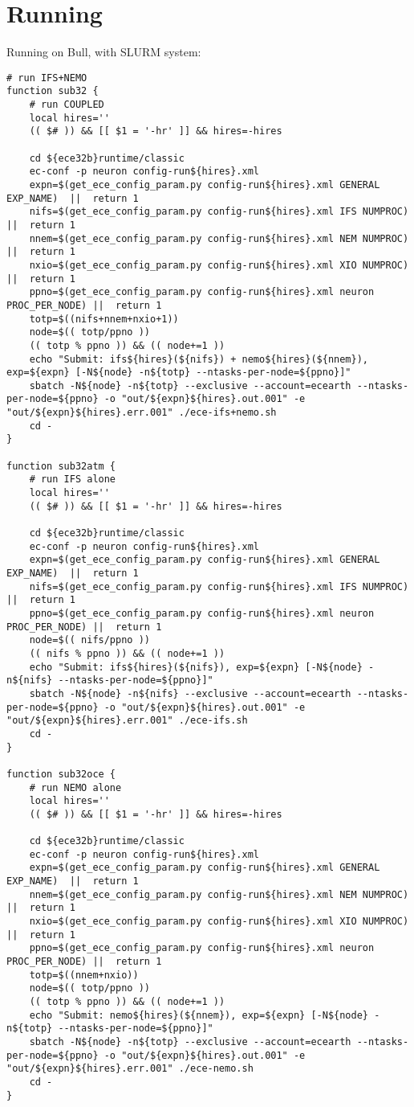 \section{Running}
Running on Bull, with SLURM system:
\begin{lstlisting}
# run IFS+NEMO
function sub32 {
    # run COUPLED
    local hires=''
    (( $# )) && [[ $1 = '-hr' ]] && hires=-hires
    
    cd ${ece32b}runtime/classic
    ec-conf -p neuron config-run${hires}.xml
    expn=$(get_ece_config_param.py config-run${hires}.xml GENERAL EXP_NAME)  ||  return 1
    nifs=$(get_ece_config_param.py config-run${hires}.xml IFS NUMPROC)    ||  return 1
    nnem=$(get_ece_config_param.py config-run${hires}.xml NEM NUMPROC)    ||  return 1
    nxio=$(get_ece_config_param.py config-run${hires}.xml XIO NUMPROC)    ||  return 1
    ppno=$(get_ece_config_param.py config-run${hires}.xml neuron PROC_PER_NODE) ||  return 1 
    totp=$((nifs+nnem+nxio+1))
    node=$(( totp/ppno ))
    (( totp % ppno )) && (( node+=1 ))
    echo "Submit: ifs${hires}(${nifs}) + nemo${hires}(${nnem}), exp=${expn} [-N${node} -n${totp} --ntasks-per-node=${ppno}]"
    sbatch -N${node} -n${totp} --exclusive --account=ecearth --ntasks-per-node=${ppno} -o "out/${expn}${hires}.out.001" -e "out/${expn}${hires}.err.001" ./ece-ifs+nemo.sh
    cd -
}

function sub32atm {
    # run IFS alone
    local hires=''
    (( $# )) && [[ $1 = '-hr' ]] && hires=-hires

    cd ${ece32b}runtime/classic
    ec-conf -p neuron config-run${hires}.xml
    expn=$(get_ece_config_param.py config-run${hires}.xml GENERAL EXP_NAME)  ||  return 1
    nifs=$(get_ece_config_param.py config-run${hires}.xml IFS NUMPROC)    ||  return 1
    ppno=$(get_ece_config_param.py config-run${hires}.xml neuron PROC_PER_NODE) ||  return 1
    node=$(( nifs/ppno ))
    (( nifs % ppno )) && (( node+=1 ))
    echo "Submit: ifs${hires}(${nifs}), exp=${expn} [-N${node} -n${nifs} --ntasks-per-node=${ppno}]"
    sbatch -N${node} -n${nifs} --exclusive --account=ecearth --ntasks-per-node=${ppno} -o "out/${expn}${hires}.out.001" -e "out/${expn}${hires}.err.001" ./ece-ifs.sh
    cd -
}

function sub32oce {
    # run NEMO alone
    local hires=''
    (( $# )) && [[ $1 = '-hr' ]] && hires=-hires

    cd ${ece32b}runtime/classic
    ec-conf -p neuron config-run${hires}.xml
    expn=$(get_ece_config_param.py config-run${hires}.xml GENERAL EXP_NAME)  ||  return 1
    nnem=$(get_ece_config_param.py config-run${hires}.xml NEM NUMPROC)    ||  return 1
    nxio=$(get_ece_config_param.py config-run${hires}.xml XIO NUMPROC)    ||  return 1
    ppno=$(get_ece_config_param.py config-run${hires}.xml neuron PROC_PER_NODE) ||  return 1
    totp=$((nnem+nxio))
    node=$(( totp/ppno ))
    (( totp % ppno )) && (( node+=1 ))
    echo "Submit: nemo${hires}(${nnem}), exp=${expn} [-N${node} -n${totp} --ntasks-per-node=${ppno}]"
    sbatch -N${node} -n${totp} --exclusive --account=ecearth --ntasks-per-node=${ppno} -o "out/${expn}${hires}.out.001" -e "out/${expn}${hires}.err.001" ./ece-nemo.sh
    cd -
}

\end{lstlisting}
